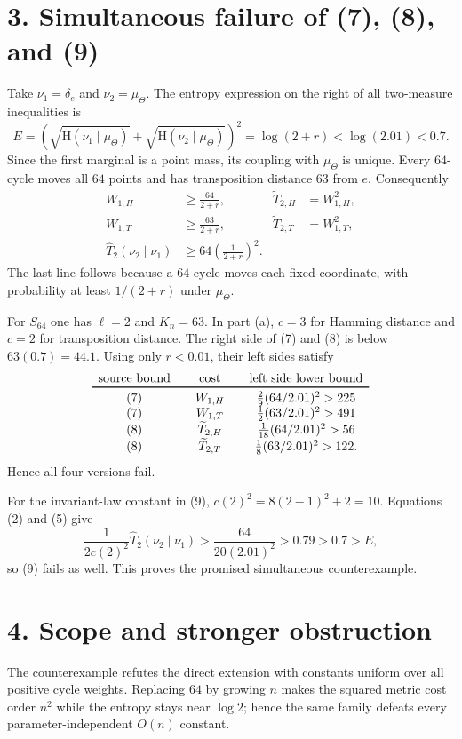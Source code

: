\documentclass[11pt]{article}
\newcommand{\Ent}{\mathrm H}
\newcommand{\whT}{\widehat T_2}
\begin{document}
\section*{3. Simultaneous failure of (7), (8), and (9)}
Take $\nu_1=\delta_e$ and $\nu_2=\mu_\Theta$.  The entropy expression on the
right of all two-measure inequalities is
\[
 E=\left(\sqrt{\Ent(\nu_1\mid\mu_\Theta)}+
 \sqrt{\Ent(\nu_2\mid\mu_\Theta)}\right)^2
 =\log(2+r)<\log(2.01)<0.7. \tag{2}
\]
Since the first marginal is a point mass, its coupling with $\mu_\Theta$ is
unique.  Every $64$-cycle moves all $64$ points and has transposition distance
$63$ from $e$.  Consequently
\begin{align}
 W_{1,H}&\ge\frac{64}{2+r}, &
 \widetilde T_{2,H}&=W_{1,H}^2,\tag{3}\\
 W_{1,T}&\ge\frac{63}{2+r}, &
 \widetilde T_{2,T}&=W_{1,T}^2,\tag{4}\\
 \whT(\nu_2\mid\nu_1)&\ge
 64\left(\frac1{2+r}\right)^2. &&\tag{5}
\end{align}
The last line follows because a $64$-cycle moves each fixed coordinate, with
probability at least $1/(2+r)$ under $\mu_\Theta$.

For $S_{64}$ one has $\ell=2$ and $K_n=63$.  In part (a), $c=3$ for Hamming
distance and $c=2$ for transposition distance.  The right side of (7) and (8)
is below $63(0.7)=44.1$.  Using only $r<0.01$, their left sides satisfy
\[
\begin{array}{c@{\qquad}c@{\qquad}c}
\text{source bound}&\text{cost}&\text{left side lower bound}\\ \toprule
(7)&W_{1,H}&\frac{2}{9}(64/2.01)^2>225\\
(7)&W_{1,T}&\frac{1}{2}(63/2.01)^2>491\\
(8)&\widetilde T_{2,H}&\frac{1}{18}(64/2.01)^2>56\\
(8)&\widetilde T_{2,T}&\frac{1}{8}(63/2.01)^2>122.
\end{array}
\]
Hence all four versions fail.

For the invariant-law constant in (9), $c(2)^2=8(2-1)^2+2=10$.  Equations
(2) and (5) give
\[
 \frac1{2c(2)^2}\whT(\nu_2\mid\nu_1)
 >\frac{64}{20(2.01)^2}>0.79>0.7>E,
\]
so (9) fails as well.  This proves the promised simultaneous counterexample.

\section*{4. Scope and stronger obstruction}
The counterexample refutes the direct extension with constants uniform over
all positive cycle weights.  Replacing $64$ by growing $n$ makes the squared
metric cost order $n^2$ while the entropy stays near $\log2$; hence the same
family defeats every parameter-independent $O(n)$ constant.
\end{document}
